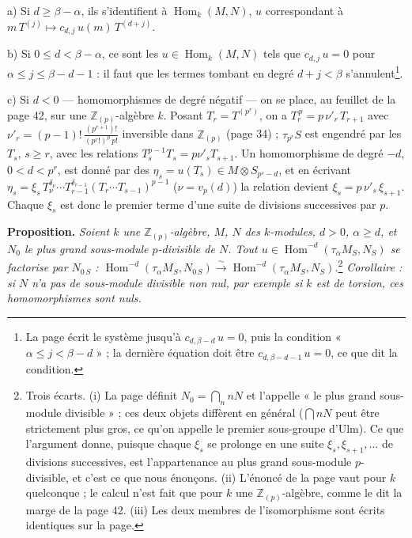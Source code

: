 \documentclass[11pt,a4paper]{article}
\begin{document}
a) Si $d \geq \beta - \alpha$, ils s'identifient à $\operatorname{Hom}_k(M, N)$,
$u$ correspondant à $m\,T^{(j)} \mapsto c_{d,j}\, u(m)\, T^{(d+j)}$.

b) Si $0 \leq d < \beta - \alpha$, ce sont les $u \in \operatorname{Hom}_k(M,
N)$ tels que $c_{d,j}\, u = 0$ pour $\alpha \leq j \leq \beta - d - 1$ : il faut
que les termes tombant en degré $d + j < \beta$ s'annulent\footnote{La page
écrit le système jusqu'à $c_{d,\beta-d}\,u = 0$, puis la condition « $\alpha
\leq j < \beta - d$ » ; la dernière équation doit être $c_{d, \beta-d-1}\,u =
0$, ce que dit la condition.}.

c) Si $d < 0$ — homomorphismes de degré négatif — on se place, au feuillet
de la page 42, sur une $\mathbb{Z}_{(p)}$-algèbre $k$. Posant $T_r =
T^{(p^r)}$, on a $T_r^{\,p} = p\,\nu'_r\, T_{r+1}$ avec $\nu'_r = (p-1)!\,
\frac{(p^{r+1})!}{(p^r!)^p\, p!}$ inversible dans $\mathbb{Z}_{(p)}$ (page 34) ;
$\tau_{p^r}S$ est engendré par les $T_s$, $s \geq r$, avec les relations
$T_s^{p-1} T_s = p\nu'_s T_{s+1}$. Un homomorphisme de degré $-d$, $0 < d <
p^r$, est donné par des $\eta_s = u(T_s) \in M \otimes S_{p^s - d}$, et en
écrivant $\eta_s = \xi_s\, T_\nu^{\delta_\nu} \cdots
T_{r-1}^{\delta_{r-1}}(T_r \cdots T_{s-1})^{p-1}$ ($\nu = v_p(d)$) la relation
devient $\xi_s = p\,\nu'_s\,\xi_{s+1}$. Chaque $\xi_s$ est donc le premier terme
d'une suite de divisions successives par $p$.

\textbf{Proposition.} \emph{Soient $k$ une $\mathbb{Z}_{(p)}$-algèbre, $M$, $N$
des $k$-modules, $d > 0$, $\alpha \geq d$, et $N_0$ le plus grand sous-module
$p$-divisible de $N$. Tout $u \in \operatorname{Hom}^{-d}(\tau_\alpha M_S, N_S)$
se factorise par $N_{0\,S}$ : $\operatorname{Hom}^{-d}(\tau_\alpha M_S,
N_{0\,S}) \xrightarrow{\sim} \operatorname{Hom}^{-d}(\tau_\alpha M_S,
N_S)$.}\footnote{Trois écarts. (i) La page définit $N_0 = \bigcap_{n} nN$ et
l'appelle « le plus grand sous-module divisible » ; ces deux objets diffèrent
en général ($\bigcap nN$ peut être strictement plus gros, ce qu'on appelle le
premier sous-groupe d'Ulm). Ce que l'argument donne, puisque chaque $\xi_s$ se
prolonge en une suite $\xi_s, \xi_{s+1}, \ldots$ de divisions successives, est
l'appartenance au plus grand sous-module $p$-divisible, et c'est ce que nous
énonçons. (ii) L'énoncé de la page vaut pour $k$ quelconque ; le calcul n'est
fait que pour $k$ une $\mathbb{Z}_{(p)}$-algèbre, comme le dit la marge de la
page 42. (iii) Les deux membres de l'isomorphisme sont écrits identiques sur la
page.} \emph{Corollaire : si $N$ n'a pas de sous-module divisible non nul, par
exemple si $k$ est de torsion, ces homomorphismes sont nuls.}
\end{document}
